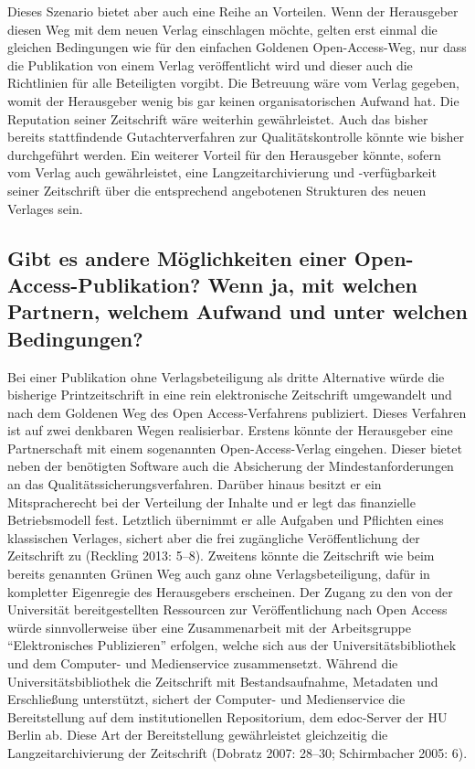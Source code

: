 \documentclass[a4paper,
fontsize=11pt,
oneside,
numbers=noperiodatend,
parskip=half-,
bibliography=totoc,
final
]{scrartcl}
\begin{document}
Dieses Szenario bietet aber auch eine Reihe an Vorteilen. Wenn der
Herausgeber diesen Weg mit dem neuen Verlag einschlagen möchte, gelten
erst einmal die gleichen Bedingungen wie für den einfachen Goldenen
Open-Access-Weg, nur dass die Publikation von einem Verlag
veröffentlicht wird und dieser auch die Richtlinien für alle Beteiligten
vorgibt. Die Betreuung wäre vom Verlag gegeben, womit der Herausgeber
wenig bis gar keinen organisatorischen Aufwand hat. Die Reputation
seiner Zeitschrift wäre weiterhin gewährleistet. Auch das bisher bereits
stattfindende Gutachterverfahren zur Qualitätskontrolle könnte wie
bisher durchgeführt werden. Ein weiterer Vorteil für den Herausgeber
könnte, sofern vom Verlag auch gewährleistet, eine Langzeitarchivierung
und -verfügbarkeit seiner Zeitschrift über die entsprechend angebotenen
Strukturen des neuen Verlages sein.

\subsection*{Gibt es andere Möglichkeiten einer Open-Access-Publikation?
Wenn ja, mit welchen Partnern, welchem Aufwand und unter welchen
Bedingungen?}\label{gibt-es-andere-muxf6glichkeiten-einer-open-access-publikation-wenn-ja-mit-welchen-partnern-welchem-aufwand-und-unter-welchen-bedingungen}

Bei einer Publikation ohne Verlagsbeteiligung als dritte Alternative
würde die bisherige Printzeitschrift in eine rein elektronische
Zeitschrift umgewandelt und nach dem Goldenen Weg des Open
Access-Verfahrens publiziert. Dieses Verfahren ist auf zwei denkbaren
Wegen realisierbar. Erstens könnte der Herausgeber eine Partnerschaft
mit einem sogenannten Open-Access-Verlag eingehen. Dieser bietet neben
der benötigten Software auch die Absicherung der Mindestanforderungen an
das Qualitätssicherungsverfahren. Darüber hinaus besitzt er ein
Mitspracherecht bei der Verteilung der Inhalte und er legt das
finanzielle Betriebsmodell fest. Letztlich übernimmt er alle Aufgaben
und Pflichten eines klassischen Verlages, sichert aber die frei
zugängliche Veröffentlichung der Zeitschrift zu (Reckling 2013: 5--8).
Zweitens könnte die Zeitschrift wie beim bereits genannten Grünen Weg
auch ganz ohne Verlagsbeteiligung, dafür in kompletter Eigenregie des
Herausgebers erscheinen. Der Zugang zu den von der Universität
bereitgestellten Ressourcen zur Veröffentlichung nach Open Access würde
sinnvollerweise über eine Zusammenarbeit mit der Arbeitsgruppe
\enquote{Elektronisches Publizieren} erfolgen, welche sich aus der
Universitätsbibliothek und dem Computer- und Medienservice
zusammensetzt. Während die Universitätsbibliothek die Zeitschrift mit
Bestandsaufnahme, Metadaten und Erschließung unterstützt, sichert der
Computer- und Medienservice die Bereitstellung auf dem institutionellen
Repositorium, dem edoc-Server der HU Berlin ab. Diese Art der
Bereitstellung gewährleistet gleichzeitig die Langzeitarchivierung der
Zeitschrift (Dobratz 2007: 28--30; Schirmbacher 2005: 6).
\end{document}
